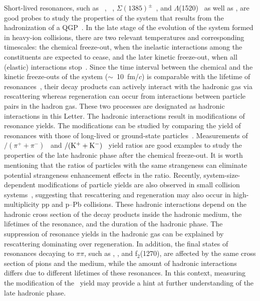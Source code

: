 Short-lived resonances, such as \rhoz~\cite{ALICE:2018qdv}, \kstar~\cite{ALICE:2019etb, ALICE:2016sak}, $\Sigma(1385)^{\pm}$~\cite{ALICE:2022zuc}, and $\Lambda$(1520)~\cite{ALICE:2018ewo} as well as \fzero, are good probes to study the properties of the system that results from the hadronization of a QGP~\cite{Bierlich:2021poz, Knospe:2015nva}. In the late stage of the evolution of the system formed in heavy-ion collisions, there are two relevant temperatures and corresponding timescales: the chemical freeze-out, when the inelastic interactions among the constituents are expected to cease, and the later kinetic freeze-out, when all (elastic) interactions stop~\cite{Song:1996ik}. Since the time interval between the chemical and the kinetic freeze-outs of the system ($\sim$~10~fm/$c$) is comparable with the lifetime of resonances~\cite{ALICE:2011dyt, ALICE:2019xyr}, their decay products can actively interact with the hadronic gas via rescattering whereas regeneration can occur from interactions between particle pairs in the hadron gas. These two processes are designated as hadronic interactions in this Letter. The hadronic interactions result in modifications of resonance yields. The modifications can be studied by comparing the yield of resonances with those of long-lived or ground-state particles~\cite{ALICE:2018pal}. Measurements of \rhoz$/(\pi^{+}+\pi^{-})$~\cite{ALICE:2018qdv} and \kstar$\rm{}/(K^{+}+K^{-})$~\cite{ALICE:2019etb, ALICE:2016sak} yield ratios are good examples to study the properties of the late hadronic phase after the chemical freeze-out. It is worth mentioning that the ratios of particles with the same strangeness can eliminate potential strangeness enhancement effects in the ratio. Recently, system-size-dependent modifications of particle yields are also observed in small collision systems~\cite{ALICE:2016sak, ALICE:2019etb}, suggesting that rescattering and regeneration may also occur in high-multiplicity pp and p--Pb collisions. These hadronic interactions depend on the hadronic cross section of the decay products inside the hadronic medium, the lifetimes of the resonance, and the duration of the hadronic phase. The suppression of resonance yields in the hadronic gas can be explained by rescattering dominating over regeneration. In addition, the final states of resonances decaying to $\pi\pi$, such as \fzero, \rhoz, and f$_{2}$(1270), are affected by the same cross section of pions and the medium, while the amount of hadronic interactions differs due to different lifetimes of these resonances. In this context, measuring the modification of the \fzero~yield may provide a hint at further understanding of the late hadronic phase.


